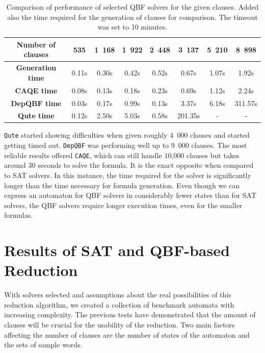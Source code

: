 \begin{table}[hb]
    \centering
    \label{tab:QBF_compare}
    \caption{Comparison of performance of selected QBF solvers for the given clauses. Added also the time required for the generation of clauses for comparison. The timeout was set to 10 minutes.}
    \vspace{0.3cm}
    \begin{tabular}{|c||c|c|c|c|c|c|c|} \hline
        \textbf{Number of clauses} & 535 & 1\ 168 & 1\ 922 & 2\ 448 & 3\ 137 & 5\ 210 & 8\ 898 \\ \hline \hline
        \textbf{Generation time} & 0.11s & 0.30s & 0.42s & 0.52s & 0.67s & 1.07s & 1.92s \\ \hline
        \textbf{CAQE time} & 0.08s & 0.13s & 0.18s & 0.23s & 0.69s & 1.12s & 2.24s \\ \hline
        \textbf{DepQBF time} & 0.03s & 0.17s & 0.99s & 0.13s & 3.37s & 6.18s & 311.57s \\ \hline
        \textbf{Qute time} & 0.12s & 2.50s & 5.03s & 0.58s & 201.35s & - & - \\ \hline
    \end{tabular}
\end{table}

\texttt{Qute} started showing difficulties when given roughly 4\ 000 clauses and started getting timed out. \texttt{DepQBF} was performing well up to 9\ 000 clauses. The most reliable results offered \texttt{CAQE}, which can still handle 10,000 clauses but takes around 30 seconds to solve the formula. It is the exact opposite when compared to SAT solvers. In this instance, the time required for the solver is significantly longer than the time necessary for formula generation. Even though we can express an automaton for QBF solvers in considerably fewer states than for SAT solvers, the QBF solvers require longer execution times, even for the smaller formulas.


\section{Results of SAT and QBF-based Reduction}

With solvers selected and assumptions about the real possibilities of this reduction algorithm, we created a collection of benchmark automata with increasing complexity. The previous tests have demonstrated that the amount of clauses will be crucial for the usability of the reduction. Two main factors affecting the number of clauses are the number of states of the automaton and the sets of sample words. 

